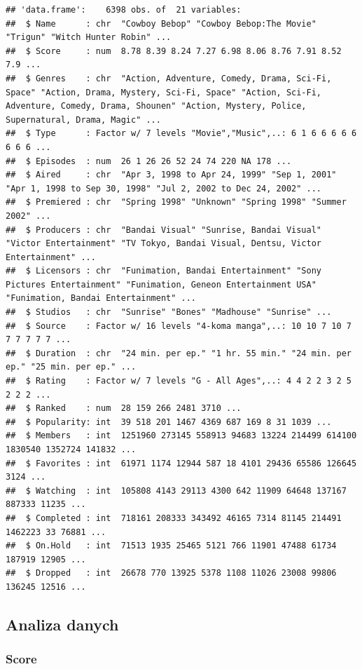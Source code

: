 \documentclass[
]{article}
\begin{document}
\begin{verbatim}
## 'data.frame':    6398 obs. of  21 variables:
##  $ Name      : chr  "Cowboy Bebop" "Cowboy Bebop:The Movie" "Trigun" "Witch Hunter Robin" ...
##  $ Score     : num  8.78 8.39 8.24 7.27 6.98 8.06 8.76 7.91 8.52 7.9 ...
##  $ Genres    : chr  "Action, Adventure, Comedy, Drama, Sci-Fi, Space" "Action, Drama, Mystery, Sci-Fi, Space" "Action, Sci-Fi, Adventure, Comedy, Drama, Shounen" "Action, Mystery, Police, Supernatural, Drama, Magic" ...
##  $ Type      : Factor w/ 7 levels "Movie","Music",..: 6 1 6 6 6 6 6 6 6 6 ...
##  $ Episodes  : num  26 1 26 26 52 24 74 220 NA 178 ...
##  $ Aired     : chr  "Apr 3, 1998 to Apr 24, 1999" "Sep 1, 2001" "Apr 1, 1998 to Sep 30, 1998" "Jul 2, 2002 to Dec 24, 2002" ...
##  $ Premiered : chr  "Spring 1998" "Unknown" "Spring 1998" "Summer 2002" ...
##  $ Producers : chr  "Bandai Visual" "Sunrise, Bandai Visual" "Victor Entertainment" "TV Tokyo, Bandai Visual, Dentsu, Victor Entertainment" ...
##  $ Licensors : chr  "Funimation, Bandai Entertainment" "Sony Pictures Entertainment" "Funimation, Geneon Entertainment USA" "Funimation, Bandai Entertainment" ...
##  $ Studios   : chr  "Sunrise" "Bones" "Madhouse" "Sunrise" ...
##  $ Source    : Factor w/ 16 levels "4-koma manga",..: 10 10 7 10 7 7 7 7 7 7 ...
##  $ Duration  : chr  "24 min. per ep." "1 hr. 55 min." "24 min. per ep." "25 min. per ep." ...
##  $ Rating    : Factor w/ 7 levels "G - All Ages",..: 4 4 2 2 3 2 5 2 2 2 ...
##  $ Ranked    : num  28 159 266 2481 3710 ...
##  $ Popularity: int  39 518 201 1467 4369 687 169 8 31 1039 ...
##  $ Members   : int  1251960 273145 558913 94683 13224 214499 614100 1830540 1352724 141832 ...
##  $ Favorites : int  61971 1174 12944 587 18 4101 29436 65586 126645 3124 ...
##  $ Watching  : int  105808 4143 29113 4300 642 11909 64648 137167 887333 11235 ...
##  $ Completed : int  718161 208333 343492 46165 7314 81145 214491 1462223 33 76881 ...
##  $ On.Hold   : int  71513 1935 25465 5121 766 11901 47488 61734 187919 12905 ...
##  $ Dropped   : int  26678 770 13925 5378 1108 11026 23008 99806 136245 12516 ...
\end{verbatim}

\subsection{Analiza danych}\label{analiza-danych}

\subsubsection{Score}\label{score}
\end{document}
